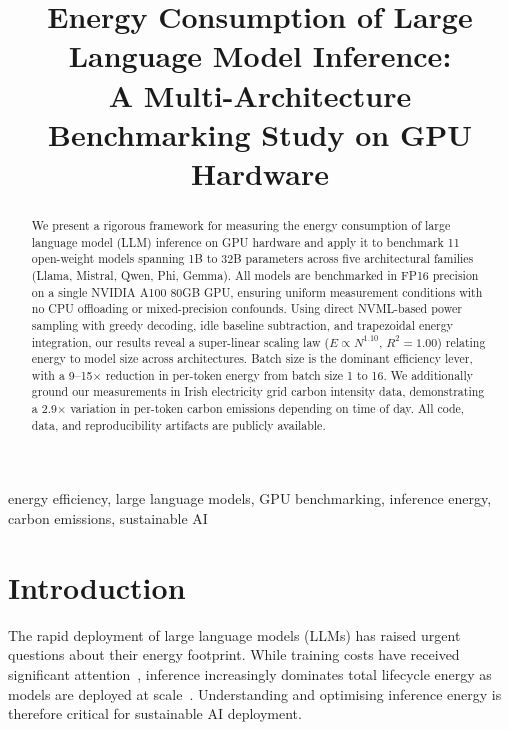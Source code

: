 \documentclass[conference]{IEEEtran}
\begin{document}
\title{Energy Consumption of Large Language Model Inference:\\A Multi-Architecture Benchmarking Study on GPU Hardware}

\author{
}

\maketitle

\begin{abstract}
We present a rigorous framework for measuring the energy consumption of large language model (LLM) inference on GPU hardware and apply it to benchmark 11 open-weight models spanning 1B to 32B parameters across five architectural families (Llama, Mistral, Qwen, Phi, Gemma). All models are benchmarked in FP16 precision on a single NVIDIA A100 80GB GPU, ensuring uniform measurement conditions with no CPU offloading or mixed-precision confounds. Using direct NVML-based power sampling with greedy decoding, idle baseline subtraction, and trapezoidal energy integration, our results reveal a super-linear scaling law ($E \propto N^{1.10}$, $R^2=1.00$) relating energy to model size across architectures. Batch size is the dominant efficiency lever, with a 9--15$\times$ reduction in per-token energy from batch size 1 to 16. We additionally ground our measurements in Irish electricity grid carbon intensity data, demonstrating a 2.9$\times$ variation in per-token carbon emissions depending on time of day. All code, data, and reproducibility artifacts are publicly available.
\end{abstract}

\begin{IEEEkeywords}
energy efficiency, large language models, GPU benchmarking, inference energy, carbon emissions, sustainable AI
\end{IEEEkeywords}

\section{Introduction}

The rapid deployment of large language models (LLMs) has raised urgent questions about their energy footprint. While training costs have received significant attention~\cite{strubell2019energy, patterson2021carbon}, inference increasingly dominates total lifecycle energy as models are deployed at scale~\cite{desislavov2023trends}. Understanding and optimising inference energy is therefore critical for sustainable AI deployment.
\end{document}
